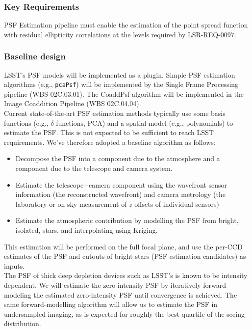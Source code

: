 \documentclass[12pt]{article}
\newcommand{\wbsSFM}{WBS 02C.03.01}
\newcommand{\wbsCoadd}{WBS 02C.04.04}
\begin{document}
\subsubsection{Key Requirements}

PSF Estimation pipeline must enable the estimation of the point spread function with residual ellipticity correlations at the levels required by LSR-REQ-0097.

\subsubsection{Baseline design}

LSST's PSF models will be implemented as a plugin. Simple PSF estimation algorithms (e.g., {\tt pcaPsf}) will be implemented by the Single Frame Processing pipeline (\wbsSFM). The CoaddPsf algorithm will be implemented in the Image Coaddition Pipeline (\wbsCoadd).
\\

Current state-of-the-art PSF estimation methods typically use some basis functions (e.g., $\delta$-functions, PCA) and a spatial model (e.g., polynomials) to estimate the PSF\@. This is not expected to be sufficient to reach LSST requirements. We've therefore adopted a baseline algorithm as follows:
\begin{itemize}
    \item Decompose the PSF into a component due to the atmosphere and a component due to the telescope and camera system.
    \item Estimate the telescope+camera component using the wavefront sensor information (the reconstructed wavefront) and camera metrology (the laboratory or on-sky measurement of $z$ offsets of individual sensors)
    \item Estimate the atmospheric contribution by modelling the PSF from bright, isolated, stars, and interpolating using Kriging. %
\end{itemize}
This estimation will be performed on the full focal plane, and use the per-CCD estimates of the PSF and cutouts of bright stars (PSF estimation candidates) as inputs.
\\
The PSF of thick deep depletion devices such as LSST's is known to be intensity dependent. We will estimate the zero-intensity PSF by iteratively forward-modeling the estimated zero-intensity PSF until convergence is achieved. The same forward-modelling algorithm will allow us to estimate the PSF in undersampled imaging, as is expected for roughly the best quartile of the seeing distribution.
\end{document}
